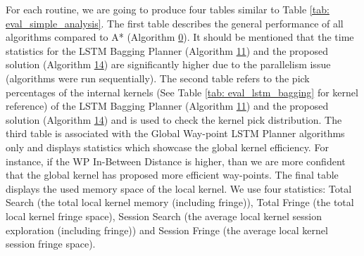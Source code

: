 
For each routine, we are going to produce four tables similar to Table \ref{tab: eval_simple_analysis}. The first table describes the general performance of all algorithms compared to A* (Algorithm \hyperref[tab: evalalgorithms]{0}). It should be mentioned that the time statistics for the LSTM Bagging Planner (Algorithm \hyperref[tab: evalalgorithms]{11}) and the proposed solution (Algorithm \hyperref[tab: evalalgorithms]{14}) are significantly higher due to the parallelism issue (algorithms were run sequentially). The second table refers to the pick percentages of the internal kernels (See Table \ref{tab: eval_lstm_bagging} for kernel reference) of the LSTM Bagging Planner (Algorithm \hyperref[tab: evalalgorithms]{11}) and the proposed solution (Algorithm \hyperref[tab: evalalgorithms]{14})  and is used to check the kernel pick distribution. The third table is associated with the Global Way-point LSTM Planner algorithms only and displays statistics which showcase the global kernel efficiency. For instance, if the WP In-Between Distance is higher, than we are more confident that the global kernel has proposed more efficient way-points. The final table displays the used memory space of the local kernel. We use four statistics: Total Search (the total local kernel memory (including fringe)), Total Fringe (the total local kernel fringe space), Session Search (the average local kernel session exploration (including fringe)) and Session Fringe (the average local kernel session fringe space).

